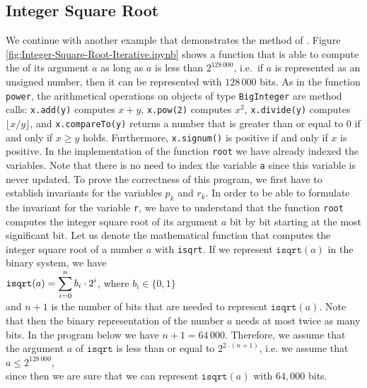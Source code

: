 \subsection{Integer Square Root}
We continue with another example that demonstrates the method of .
Figure \ref{fig:Integer-Square-Root-Iterative.ipynb} shows a function that is able to compute the
 of its argument $a$ as long as $a$ is less than $2^{128\,000}$, i.e.~if $a$ is represented as an unsigned
number, then it can be represented with $128\,000$ bits.  As in the function \texttt{power}, the arithmetical operations on
objects of type \texttt{BigInteger} are method calls:  \texttt{x.add(y)} computes $x + y$, \texttt{x.pow(2)}
computes $x^2$, \texttt{x.divide(y)} computes $\lfloor x / y \rfloor$, and \texttt{x.compareTo(y)} returns
a number that is greater than or equal to $0$ if and only if $x \geq y$ holds.  Furthermore,
\texttt{x.signum()} is positive if and only if $x$ is positive.
In the implementation of the function \texttt{root} we have
already indexed the variables.  Note that there is no 
need to index the variable \texttt{a} since this variable is never updated.  To prove the correctness of this
program, we first 
have to establish invariants for the variables $p_k$ and $r_k$.  In order to be able to formulate the invariant
for the variable \texttt{r}, we have to understand that the function \texttt{root} computes the integer square
root of its argument $a$ bit by bit starting at the most significant bit.  Let us denote the
mathematical function that computes the integer square root of a number $a$ with \texttt{isqrt}.  If we
represent $\texttt{isqrt}(a)$ in the binary system, we have
\\[0.2cm]
\hspace*{1.3cm}
$\displaystyle \mathtt{isqrt}(a) = \sum\limits_{i=0}^{n} b_i \cdot 2^i$, \quad where $b_i \in \{0,1\}$
\\[0.2cm]
and $n+1$ is the number of bits that are needed to represent $\mathtt{isqrt}(a)$.  Note that then the binary
representation of the number $a$ needs at most twice as many bits.  In the program below we have $n+1 = 64\,000$.
Therefore, we assume that the argument $a$ of $\mathtt{isqrt}$ is less than or equal to $2^{2\cdot (n+1)}$,
i.e. we assume that
\\[0.2cm]
\hspace*{1.3cm}
$a \leq 2^{128\,000}$,
\\[0.2cm]
since then we are sure that we can represent $\mathtt{isqrt}(a)$ with $64,000$ bits.
